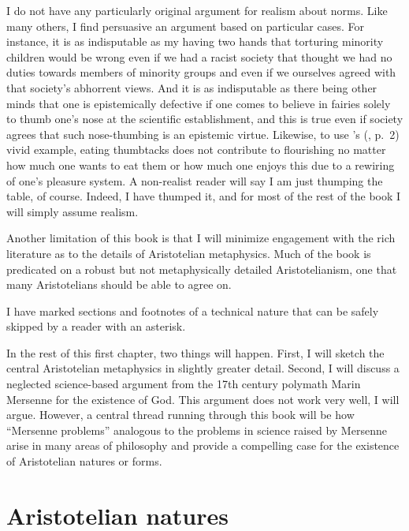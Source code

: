 I do not have any particularly original argument for realism about norms. Like many others, I find persuasive an argument based on particular
cases. For instance, it is as indisputable as my having two hands that torturing minority children would be wrong even if we had 
a racist society that thought we had no duties towards members of minority groups and even if we ourselves agreed with 
that society's abhorrent views. And it is as indisputable as there being other minds that one is epistemically defective if one comes 
to believe in fairies solely to thumb one's nose at the scientific establishment, and this is true even if society agrees 
that such nose-thumbing is an epistemic virtue. Likewise, to use \citeauthor{McInernyET}'s (\citeyear{McInernyET}, p.~2) vivid example, eating thumbtacks does not contribute to flourishing no matter how much one wants 
to eat them or how much one enjoys this due to a rewiring of one's pleasure system. A non-realist reader will say I am just thumping the table, of course. 
Indeed, I have thumped it, and for most of the rest of the book I will simply assume realism.

Another limitation of this book is that I will minimize engagement with the rich literature as to the details of
Aristotelian metaphysics. Much of the book is predicated on a robust but not metaphysically detailed Aristotelianism,
one that many Aristotelians should be able to agree on.

I have marked sections and footnotes of a technical nature that can be safely skipped by a reader with an asterisk.

In the rest of this first chapter, two things will happen. First, I will sketch the central Aristotelian metaphysics in slightly
greater detail. Second, I will discuss a neglected science-based argument from the 17th century polymath Marin Mersenne for the existence 
of God. This argument does not work very well, I will argue. However, a central thread running through this book will be how ``Mersenne 
problems'' analogous to the problems in science raised by Mersenne arise in many areas of philosophy and provide a compelling 
case for the existence of Aristotelian natures or forms.

\section{Aristotelian natures}
